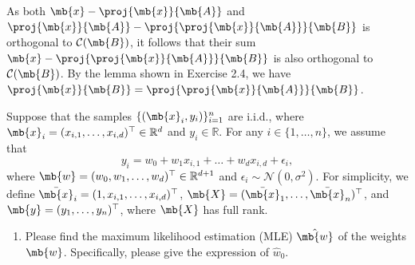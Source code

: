 \begin{exercise}[Projection ]
\begin{enumerate}
\begin{solution}
                As both $\mb{x} - \proj{\mb{x}}{\mb{A}}$ and $\proj{\mb{x}}{\mb{A}} - \proj{\proj{\mb{x}}{\mb{A}}}{\mb{B}}$ is orthogonal to $\mathcal{C}(\mb{B})$, it follows that their sum $\mb{x} - \proj{\proj{\mb{x}}{\mb{A}}}{\mb{B}}$ is also orthogonal to $\mathcal{C}(\mb{B})$. By the lemma shown in Exercise 2.4, we have $\proj{\mb{x}}{\mb{B}} = \proj{\proj{\mb{x}}{\mb{A}}}{\mb{B}}$. \qedhere
            \end{solution}
            
    \end{enumerate}
\end{exercise}
\newpage




\begin{exercise}
    Suppose that the samples $\{(\mb{x}_i,y_i)\}^n_{i=1}$ are i.i.d., where $\mb{x}_i =(x_{i,1}, \dots, x_{i,d})^{\top} \in \mathbb{R}^d$  and $y_i \in \mathbb{R}$. For any $i\in \{1,\dots, n\}$, we assume that
    $$y_i =  w_0 + w_1 x_{i,1} +\dots + w_d x_{i,d} + \epsilon_i,$$
    where $\mb{w} = (w_0,w_1,\dots,w_d)^{\top}\in \mathbb{R}^{d+1}$ and $\epsilon_i\sim \mathcal{N}(0,\sigma^2)$. For simplicity, we define $\bar{\mb{x}}_i = (1, x_{i,1}, \dots,\\ x_{i,d})^\top$, $ \mb{X}=(\bar{\mb{x}}_1,\dots,\bar{\mb{x}}_n)^\top$, and $\mb{y}=(y_1,\dots,y_n)^\top$, where $\mb{X}$ has full rank.
    \begin{enumerate}
        \item Please find the maximum likelihood estimation (MLE) $\hat{\mb{w}}$ of the weights $\mb{w}$. Specifically, please give the expression of $\hat{w}_0$.
            

\end{enumerate}
\end{exercise}
